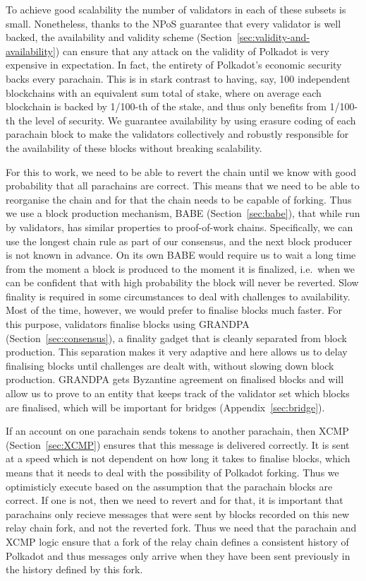To achieve good scalability the number of validators in each of these subsets is small. Nonetheless, thanks to the NPoS guarantee that every validator is well backed, the availability and validity scheme (Section~\ref{sec:validity-and-availability}) can ensure that any attack on the validity of Polkadot is very expensive in expectation. In fact, the entirety of Polkadot's economic security backs every parachain. This is in stark contrast to having, say, 100 independent blockchains with an equivalent sum total of stake, where on average each blockchain is backed by 1/100-th of the stake, and thus only benefits from 1/100-th the level of security. We guarantee availability by using erasure coding of each parachain block to make the validators collectively and robustly responsible for the availability of these blocks without breaking scalability.

For this to work, we need to be able to revert the chain until we know with good probability that all parachains are correct. This means that we need to be able to reorganise the chain and for that the chain needs to be capable of forking. Thus we use a block production mechanism, BABE (Section~\ref{sec:babe}), that while run by validators, has similar properties to proof-of-work chains. Specifically, we can use the longest chain rule as part of our consensus, and the next block producer is not known in advance. On its own BABE would require us to wait a long time from the moment a block is produced to the moment it is finalized, i.e.~when we can be confident that with high probability the block will never be reverted. Slow finality is required in some circumstances to deal with challenges to availability. Most of the time, however, we would prefer to finalise blocks much faster.  For this purpose, validators finalise blocks using GRANDPA (Section~\ref{sec:consensus}), a finality gadget that is cleanly separated from block production. This separation makes it very adaptive and here allows us to delay finalising blocks until challenges are dealt with, without slowing down block production. GRANDPA gets Byzantine agreement on finalised blocks and will allow us to prove to an entity that keeps track of the validator set which blocks are finalised, which will be important for bridges (Appendix~\ref{sec:bridge}).

If an account on one parachain sends tokens to another parachain, then XCMP (Section~\ref{sec:XCMP}) ensures that this message is delivered correctly. It is sent at a speed which is not dependent on how long it takes to finalise blocks, which means that it needs to deal with the possibility of Polkadot forking. Thus we optimisticly execute based on the assumption that the parachain blocks are correct. If one is not, then we need to revert and for that, it is important that parachains only recieve messages that were sent by blocks recorded on this new relay chain fork, and not the reverted fork. Thus we need that  the parachain and XCMP logic ensure that a fork of the relay chain defines a consistent history of Polkadot and thus messages only arrive when they have been sent previously in the history defined by this fork. 


